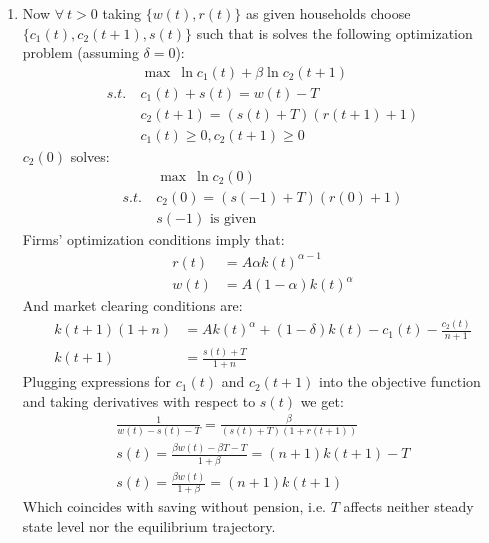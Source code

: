 \documentclass[a4paper]{article}
\begin{document}
\begin{enumerate}
\begin{enumerate}[(a)]
	\end{enumerate}
	\item Now
	$\forall\ t > 0$ taking $\{w(t), r(t)\}$ as given households choose $\{c_1(t), c_2(t+1), s(t)\}$ such that is solves the following optimization problem (assuming $\delta = 0$):
	\begin{align*}
	&\max\ \ln c_1(t) + \beta \ln c_2(t+1)\\
	s.t.\ &c_1(t) +s(t) = w(t) - T\\
	& c_2(t+1) = (s(t)+T)(r(t+1) + 1)\\
	&c_1(t) \ge 0, c_2(t+1) \ge 0
	\end{align*}
	$c_2(0)$ solves:
	\begin{align*}
	&\max\ \ln c_2(0)\\
	s.t.\ &c_2(0) = (s(-1)+T)(r(0) + 1)\\
	&s(-1) \text{ is given }
	\end{align*}
	Firms' optimization conditions imply that:
	\begin{align*}
	r(t) &= A\alpha k(t)^{\alpha - 1}\\
	w(t) &= A(1 - \alpha) k(t)^{\alpha}
	\end{align*}
	And market clearing conditions are:
	\begin{align*}
	k(t+1)(1+n) &= Ak(t)^{\alpha} + (1-\delta)k(t) - c_1(t) - \frac{c_2(t)}{n+1}\\
	k(t+1) &= \frac{s(t) + T}{1+n}
	\end{align*}
	Plugging expressions for $c_1(t)$ and $c_2(t+1)$ into  the objective function and taking derivatives with respect to $s(t)$ we get:
	\begin{align*}
	\frac{1}{w(t) - s(t) - T} = \frac{\beta}{(s(t)+T)(1 + r(t+1))}\nonumber\\
	s(t) = \frac{\beta w(t) - \beta T - T}{1+\beta} = (n+1)k(t+1) - T\\
	s(t) = \frac{\beta w(t)}{1+\beta} = (n+1)k(t+1)
	\end{align*}
	Which coincides with saving without pension, i.e. $T$ affects neither steady state level nor the equilibrium trajectory.
	\end{enumerate}
\end{document}
